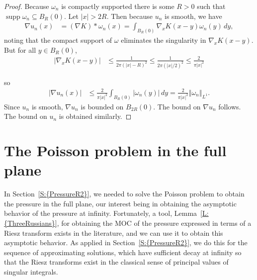 \documentclass[reqno,openright,11pt,twoside]{amsart}
\theoremstyle{definition}
\numberwithin{equation}{section}
\begin{document}
\begin{proof}
    Because $\omega_n$ is compactly supported there is some $R > 0$ such
    that $\operatorname{supp} \omega_n \subseteq B_R(0)$. Let ${\left\vert{x}\right\vert} > 2R$. Then 
    because $u_n$ is smooth, we have
    \begin{align*}
          {\ensuremath{\nabla}} u_n(x)
              &= ({\ensuremath{\nabla}} K) * \omega_n(x)
              = \int_{B_R(0)} {\ensuremath{\nabla}}_x K(x - y) \omega_n(y) \, dy,
    \end{align*}
    noting that the compact support of $\omega$ eliminates the singularity
    in ${\ensuremath{\nabla}}_x K(x - y)$.
    But  for all $y \in B_R(0)$,
    \begin{align*}
        {\left\vert{{\ensuremath{\nabla}}_x K(x - y)}\right\vert}
            &\le \frac{1}{2 \pi ({\left\vert{x}\right\vert} - R)^2}
            \le \frac{1}{2 \pi ({\left\vert{x}\right\vert}/2)^2}
            \le \frac{2}{\pi {\left\vert{x}\right\vert}^2}
    \end{align*}
    
    so
    \begin{align*}
          {\left\vert{{\ensuremath{\nabla}} u_n(x)}\right\vert}
              &\le \frac{2}{\pi {\left\vert{x}\right\vert}^2} \int_{B_R(0)}
              {\left\vert{\omega_n(y)}\right\vert} \, dy
              = \frac{2}{\pi {\left\vert{x}\right\vert}^2} {\ensuremath{\left\Vert {\omega_n} \right\Vert}}_{L^1}.
    \end{align*}
    Since $u_n$ is smooth, ${\ensuremath{\nabla}} u_n$ is bounded on $B_{2R}(0)$.
    The bound on ${\ensuremath{\nabla}} u_n$ follows. The bound on $u_n$
    is obtained similarly.
\end{proof}

\section{The Poisson problem in the full plane}\label{S:PoissonFullPlane}

\noindent In {Section~\ref{S:{PressureR2}}}, we needed to solve the Poisson problem to obtain the pressure in the full plane, our interest being in obtaining the asymptotic behavior of the pressure at infinity. Fortunately, a tool, {Lemma~\ref{L:{ThreeRussians}}}, for obtaining the MOC of the pressure expressed in terms of a Riesz transform exists in the literature, and we can use it to obtain this asymptotic behavior. As applied in {Section~\ref{S:{PressureR2}}}, we do this for the sequence of approximating solutions, which have sufficient decay at infinity so that the Riesz transforms exist in the classical sense of principal values of singular integrals.
\end{document}
